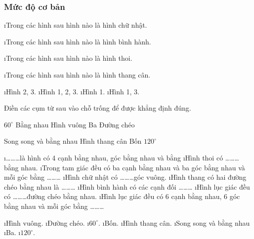 \subsubsection{Mức độ cơ bản}
\begin{bt}
	\begin{enumerate}[a), leftmargin=*]
		\i Trong các hình sau hình nào là hình chữ nhật.
		
		\i Trong các hình sau hình nào là hình bình hành.
		
		\i Trong các hình sau hình nào là hình thoi.
		
		\i Trong các hình sau hình nào là hình thang cân.
	\end{enumerate}
	\begin{loigiaichuong35}
		\begin{enumerate}[a), leftmargin=*]
			\i Hình 2, 3.
			\i Hình 1, 2, 3.
			\i Hình 1.
			\i Hình 1, 3.
		\end{enumerate}
	\end{loigiaichuong35}
\end{bt}
\begin{bt}
	Điền các cụm từ sau vào chỗ trống để được khẳng định đúng.
	\begin{center}
		$60^\circ$ \quad\quad Bằng nhau \quad\quad		Hình vuông	\quad\quad	Ba 	\quad\quad	Đường chéo
	
	Song song và bằng nhau	\quad\quad	Hình thang cân	\quad\quad	Bốn \quad\quad $120^\circ$ 
	\end{center}		 
	\begin{enumerate}[a), leftmargin=*]
		\i \ldots\ldots\ldots là hình có 4 cạnh bằng nhau,  góc bằng nhau và bằng  
		\i Hình thoi có \ldots\ldots\ldots bằng nhau.
		\i Trong tam giác đều có ba cạnh bằng nhau và ba góc bằng nhau và mỗi góc bằng \ldots\ldots\ldots
		\i Hình chữ nhật có \ldots\ldots\ldots góc vuông.
		\i Hình thang có hai đường chéo bằng nhau là \ldots\ldots\ldots
		\i Hình bình hành có các cạnh đối \ldots\ldots\ldots
		\i Hình lục giác đều có \ldots\ldots\ldots đường chéo bằng nhau.
		\i Hình lục giác đều có 6 cạnh bằng nhau, 6 góc bằng nhau và mỗi góc bằng \ldots\ldots\ldots
	\end{enumerate}
	\begin{loigiaichuong35}
		\begin{enumerate}[a), leftmargin=*]
			\i Hình vuông.
			\i Đường chéo.
			\i  $60^\circ$.
			\i Bốn.
			\i Hình thang cân.
			\i Song song và bằng nhau
			\i Ba.
			\i  $120^\circ$.
		\end{enumerate}
	\end{loigiaichuong35}
\end{bt}
